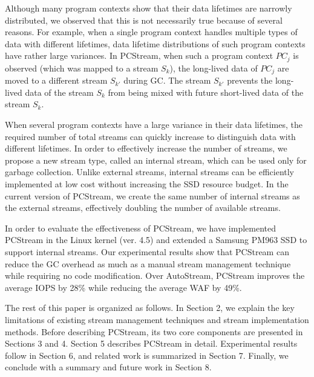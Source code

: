 Although many program contexts show that their data lifetimes are 
narrowly distributed, we observed that 
this is not necessarily true because of several reasons.  
For example, when a single program context handles multiple types of data with 
different lifetimes, data lifetime distributions of such
program contexts  
have rather large variances.
In \textsf{\small PCStream}, 
when such a program context {\it $PC_j$} is observed 
(which was mapped to a stream {\it $S_k$}), 
the long-lived data of {\it $PC_j$} are moved to a different stream {\it $S_{k'}$}
during GC.  
The stream {\it $S_{k'}$} prevents the long-lived data of the stream {\it $S_k$} 
from being mixed with future short-lived data of the stream {\it $S_k$}.

When several program contexts have a large variance in their data lifetimes, 
the required number of total streams can quickly increase to distinguish data with different lifetimes.
In order to effectively increase the number of streams, we propose a new stream type, 
called an internal stream, which can be used only for garbage collection.
Unlike external streams, internal streams can be efficiently
implemented at low cost without increasing the SSD resource budget.  
In the current version of \textsf{\small PCStream}, we create the same number of internal streams 
as the external streams, effectively doubling the number of available streams. 

In order to evaluate the effectiveness of \textsf{\small PCStream}, 
we have implemented \textsf{\small PCStream}
in the Linux kernel (ver. 4.5) and 
extended a Samsung PM963 SSD to support internal streams.
Our experimental results show that \textsf{\small PCStream}
can reduce the GC overhead as much as a 
manual stream management technique while requiring no code modification.  
Over \textsf{\small AutoStream}, \textsf{\small PCStream} improves the average IOPS
by 28\% while reducing the average WAF by 49\%.

The rest of this paper is organized as follows. 
In Section 2, we explain the key limitations of 
existing stream management techniques and stream implementation methods.
Before describing \textsf{\small PCStream}, its two core components are 
presented in Sections 3 and 4.
Section 5 describes \textsf{\small PCStream} in detail.
Experimental results follow in Section 6,
and related work is summarized in Section 7.  
Finally, we conclude with a summary and future work in Section 8.

